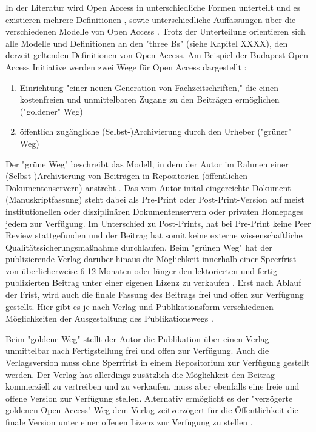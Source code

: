 In der Literatur wird Open Access in unterschiedliche Formen unterteilt und es existieren mehrere Definitionen \cite{CREATe_2014} \cite{albert_2006_open_implications}, sowie unterschiedliche Auffassungen über die verschiedenen Modelle von Open Access \cite{CREATe_2014} \cite{cite:22b} \cite{lewis_2012_inevitability}. Trotz der Unterteilung orientieren sich alle Modelle und Definitionen an den "three Bs" (siehe Kapitel XXXX), den derzeit geltenden Definitionen von Open Access. Am Beispiel der Budapest Open Access Initiative werden zwei Wege für Open Access dargestellt \cite{albert_2006_open_implications}: 
\begin{enumerate}
\item Einrichtung "einer neuen Generation von Fachzeitschriften," die einen kostenfreien und unmittelbaren Zugang zu den Beiträgen ermöglichen ("goldener" Weg)
\item öffentlich zugängliche (Selbst-)Archivierung durch den Urheber ("grüner" Weg)
\end{enumerate}

Der "grüne Weg" beschreibt das Modell, in dem der Autor im Rahmen einer (Selbst-)Archivierung von Beiträgen in Repositorien (öffentlichen Dokumentenservern) anstrebt \cite{suchen}. Das vom Autor inital eingereichte Dokument (Manuskriptfassung) steht dabei als Pre-Print oder Post-Print-Version auf meist institutionellen oder disziplinären Dokumentenservern \cite{suchen} oder privaten Homepages \cite{suchen} jedem zur Verfügung. Im Unterschied zu Post-Prints, hat bei Pre-Print keine Peer Review stattgefunden \cite{suchen} und der Beitrag hat somit keine externe wissenschaftliche Qualitätssicherungsmaßnahme durchlaufen. Beim "grünen Weg" hat der publizierende Verlag darüber hinaus die Möglichkeit innerhalb einer Speerfrist von überlicherweise 6-12 Monaten \cite{suchen} oder länger den lektorierten und fertig-publizierten Beitrag unter einer eigenen Lizenz zu verkaufen \cite{suchen}. Erst nach Ablauf der Frist, wird auch die finale Fassung des Beitrags frei und offen zur Verfügung gestellt. Hier gibt es je nach Verlag und Publikationsform verschiedenen Möglichkeiten der Ausgestaltung des Publikationswegs \cite{suchen}.

Beim "goldene Weg" stellt der Autor die Publikation über einen Verlag unmittelbar nach Fertigstellung frei und offen zur Verfügung. Auch die Verlagsversion muss ohne Sperrfrist in einem Repositorium zur Verfügung gestellt werden. Der Verlag hat allerdings zusätzlich die Möglichkeit den Beitrag kommerziell zu vertreiben und zu verkaufen, muss aber ebenfalls eine freie und offene Version zur Verfügung stellen. Alternativ ermöglicht es der "verzögerte goldenen Open Access" Weg dem Verlag zeitverzögert für die Öffentlichkeit die finale Version unter einer offenen Lizenz zur Verfügung zu stellen \cite{lewis_2012_inevitability}. 

